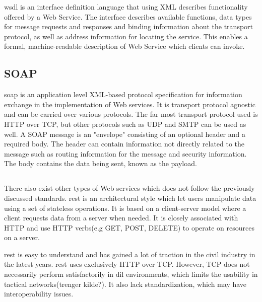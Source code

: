 \documentclass[USenglish]{ifimaster}
\begin{document}
\gls{wsdl} is an interface definition language that using XML describes
functionality offered by a Web Service. The interface describes available
functions, data types for message requests and responses and binding information
about the transport protocol, as well as address information for locating the
service. This enables a formal, machine-readable description of Web Service
which clients can invoke.


\subsection{SOAP}

\gls{soap} is an application level XML-based protocol specification for
information exchange in the implementation of Web services. It is transport
protocol agnostic and can be carried over various protocols. The far most
transport protocol used is HTTP over TCP, but other protocols such as UDP and
SMTP can be used as well. A SOAP message is an "envelope" consisting of an
optional header and a required body. The header can contain information not
directly related to the message such as routing information for the message and
security information. The body contains the data being sent, known as the
payload.

\subsection{}
\label{rest}

There also exist other types of Web services which does not follow the
previously discussed standards. \gls{rest} is an architectural style which let
users manipulate data using a set of stateless operations. It is based on a
client-server model where a client requests data from a server when needed. It
is closely associated with HTTP and use HTTP verbs(e.g GET, POST,
DELETE) to operate on resources on a server.

 \gls{rest} is easy to understand and has gained a lot of traction in the civil
 industry in the latest years. \gls{rest} uses exclusively HTTP over TCP.
 However, TCP does not necessarily perform satisfactorily in \gls{dil}
 environments, which limits the usability in tactical networks(trenger kilde?). It also lack standardization, which may have interoperability issues.
\end{document}
